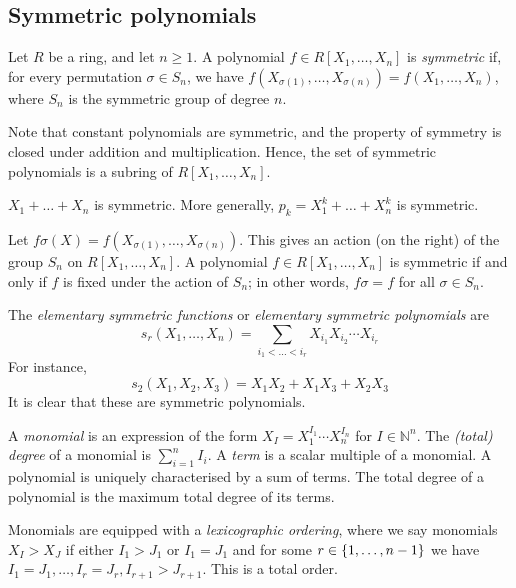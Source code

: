 \subsection{Symmetric polynomials}
\begin{definition}
	Let \( R \) be a ring, and let \( n \geq 1 \).
	A polynomial \( f \in R[X_1, \dots, X_n] \) is \emph{symmetric} if, for every permutation \( \sigma \in S_n \), we have \( f(X_{\sigma(1)}, \dots, X_{\sigma(n)}) = f(X_1, \dots, X_n) \), where \( S_n \) is the symmetric group of degree \( n \).
\end{definition}
Note that constant polynomials are symmetric, and the property of symmetry is closed under addition and multiplication.
Hence, the set of symmetric polynomials is a subring of \( R[X_1, \dots, X_n] \).
\begin{example}
	\( X_1 + \dots + X_n \) is symmetric.
	More generally, \( p_k = X_1^k + \dots + X_n^k \) is symmetric.
\end{example}
\begin{proposition}
	Let \( f \sigma(X) = f(X_{\sigma(1)}, \dots, X_{\sigma(n)}) \).
	This gives an action (on the right) of the group \( S_n \) on \( R[X_1, \dots, X_n] \).
	A polynomial \( f \in R[X_1, \dots, X_n] \) is symmetric if and only if \( f \) is fixed under the action of \( S_n \); in other words, \( f\sigma = f \) for all \( \sigma \in S_n \).
\end{proposition}
\begin{definition}
	The \emph{elementary symmetric functions} or \emph{elementary symmetric polynomials} are
	\[ s_r(X_1, \dots, X_n) = \sum_{i_1 < \dots < i_r} X_{i_1} X_{i_2} \cdots X_{i_r} \]
	For instance,
	\[ s_2(X_1, X_2, X_3) = X_1 X_2 + X_1 X_3 + X_2 X_3 \]
	It is clear that these are symmetric polynomials.
\end{definition}
\begin{definition}
	A \emph{monomial} is an expression of the form \( X_I = X_1^{I_1} \cdots X_n^{I_n} \) for \( I \in \mathbb N^n \).
	The \emph{(total) degree} of a monomial is \( \sum_{i=1}^n I_i \).
	A \emph{term} is a scalar multiple of a monomial.
	A polynomial is uniquely characterised by a sum of terms.
	The total degree of a polynomial is the maximum total degree of its terms.

	Monomials are equipped with a \emph{lexicographic ordering}, where we say monomials \( X_I > X_J \) if either \( I_1 > J_1 \) or \( I_1 = J_1 \) and for some \( r \in \qty{1, \dots, n-1} \) we have \( I_1 = J_1, \dots, I_r = J_r, I_{r+1} > J_{r+1} \).
	This is a total order.
\end{definition}
